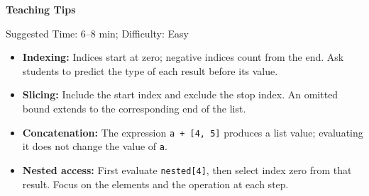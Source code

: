 \begin{questionmeta}
\textbf{Teaching Tips}\par\nopagebreak[4]
Suggested Time: 6--8 min; Difficulty: Easy
\nopagebreak[4]
\begin{itemize}
    \item \textbf{Indexing:} Indices start at zero; negative indices count from the end. Ask students to predict the type of each result before its value.
    \item \textbf{Slicing:} Include the start index and exclude the stop index. An omitted bound extends to the corresponding end of the list.
    \item \textbf{Concatenation:} The expression \lstinline{a + [4, 5]} produces a list value; evaluating it does not change the value of \lstinline{a}.
    \item \textbf{Nested access:} First evaluate \lstinline{nested[4]}, then select index zero from that result. Focus on the elements and the operation at each step.
\end{itemize}
\end{questionmeta}

